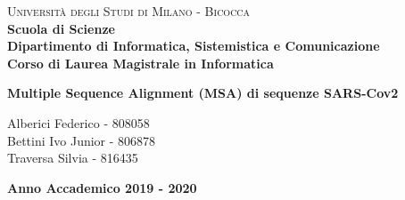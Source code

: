 \documentclass[a4paper,10pt]{article}
\begin{document}
\begin{titlepage}
\noindent
    \vspace*{5mm}
	\begin{minipage}[t]{0.15\textwidth}
	    \vspace*{5mm}
	\end{minipage}
	\hspace{1cm}
	\begin{minipage}[t]{0.90\textwidth}
	      \vspace*{5mm}
		{
			{\textsc{Università degli Studi di Milano - Bicocca} } \\
			\textbf{Scuola di Scienze} \\
			\textbf{Dipartimento di Informatica, Sistemistica e Comunicazione} \\
			\textbf{Corso di Laurea Magistrale in Informatica} \\
			\par
		}
	\end{minipage}
	
	\vspace{42mm}

\begin{center}
    {\LARGE{
    
            \textbf{Multiple Sequence Alignment (MSA) di sequenze SARS-Cov2 \\ }
    }}        
\end{center}

\vspace{40mm}
	
	
	\begin{flushright}
		\large{Alberici Federico - 808058\\} 
		\large{Bettini Ivo Junior - 806878\\} 
		\large{Traversa Silvia - 816435} 
	\end{flushright}
	
	\vspace{15mm}
	\begin{center}
		{\large{\bf Anno Accademico 2019 - 2020}}
	\end{center}


\end{titlepage}
\end{document}
